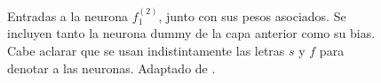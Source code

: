 \documentclass[../../main.tex]{subfiles}
\begin{document}
\begin{figure}[ht]
    \caption{Entradas a la neurona \(f^{(2)}_1\), junto con sus pesos asociados. Se
    incluyen tanto la neurona dummy de la capa anterior como su bias. Cabe aclarar que se
    usan indistintamente las letras \(s\) y \(f\) para denotar a las neuronas. Adaptado de
    \cite{tikz-neural-networks}.}
    \label{fig:neuron-weights}
\end{figure}
\end{document}
